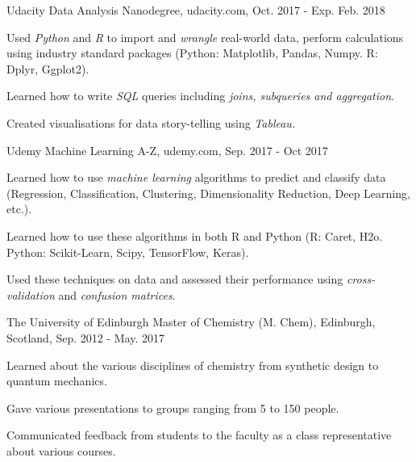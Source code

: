 


\begin{cventries}
    \cventry
      {Udacity} %
      {Data Analysis Nanodegree, } %
      {udacity.com, } %
      {Oct. 2017 - Exp. Feb. 2018} %
      {
        \begin{cvitems} %
          \item {Used \textit{Python} and \textit{R} to import and \textit{wrangle} real-world data, perform calculations using industry standard packages (Python: Matplotlib, Pandas, Numpy. R: Dplyr, Ggplot2).}
          \item {Learned how to write \textit{SQL} queries including \textit{joins, subqueries and aggregation}.}
          \item {Created visualisations for data story-telling using \textit{Tableau.}}
        \end{cvitems}
      }

      \cventry
      {Udemy} %
      {Machine Learning A-Z, } %
      {udemy.com, } %
      {Sep. 2017 - Oct 2017} %
      {
        \begin{cvitems} %
          \item {Learned how to use \textit{machine learning} algorithms to predict and classify data (Regression, Classification, Clustering, Dimensionality Reduction, Deep Learning, etc.).}
          \item {Learned how to use these algorithms in both R and Python (R: Caret, H2o. Python: Scikit-Learn, Scipy, TensorFlow, Keras).}
          \item {Used these techniques on data and assessed their performance using \textit{cross-validation} and \textit{confusion matrices}.}
        \end{cvitems}
      }

  \cventry
    {The University of Edinburgh} %
    {Master of Chemistry (M. Chem), } %
    {Edinburgh, Scotland, } %
    {Sep. 2012 - May. 2017} %
    {
      \begin{cvitems} %
        \item{Learned about the various disciplines of chemistry from synthetic design to quantum mechanics.}
        \item {Gave various presentations to groups ranging from 5 to 150 people.}
        \item{Communicated feedback from students to the faculty as a class representative about various courses. }
      \end{cvitems}
    }


\end{cventries}

